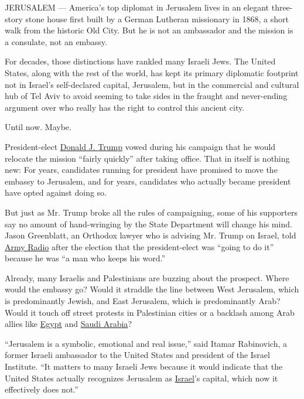 JERUSALEM --- America's top diplomat in Jerusalem lives in an elegant
three-story stone house first built by a German Lutheran missionary in
1868, a short walk from the historic Old City. But he is not an
ambassador and the mission is a consulate, not an embassy.

For decades, those distinctions have rankled many Israeli Jews. The
United States, along with the rest of the world, has kept its primary
diplomatic footprint not in Israel's self-declared capital, Jerusalem,
but in the commercial and cultural hub of Tel Aviv to avoid seeming to
take sides in the fraught and never-ending argument over who really has
the right to control this ancient city.

Until now. Maybe.

President-elect
\href{http://www.nytimes.com/topic/person/donald-trump}{Donald J. Trump}
vowed during his campaign that he would relocate the mission ``fairly
quickly'' after taking office. That in itself is nothing new: For years,
candidates running for president have promised to move the embassy to
Jerusalem, and for years, candidates who actually became president have
opted against doing so.

But just as Mr. Trump broke all the rules of campaigning, some of his
supporters say no amount of hand-wringing by the State Department will
change his mind. Jason Greenblatt, an Orthodox lawyer who is advising
Mr. Trump on Israel, told
\href{http://www.timesofisrael.com/trump-adviser-he-doesnt-see-settlements-as-peace-obstacle/}{Army
Radio} after the election that the president-elect was ``going to do
it'' because he was ``a man who keeps his word.''

Already, many Israelis and Palestinians are buzzing about the prospect.
Where would the embassy go? Would it straddle the line between West
Jerusalem, which is predominantly Jewish, and East Jerusalem, which is
predominantly Arab? Would it touch off street protests in Palestinian
cities or a backlash among Arab allies like
\href{http://www.nytimes.com/topic/destination/egypt}{Egypt} and
\href{http://www.nytimes.com/topic/destination/saudi-arabia}{Saudi
Arabia}?

``Jerusalem is a symbolic, emotional and real issue,'' said Itamar
Rabinovich, a former Israeli ambassador to the United States and
president of the Israel Institute. ``It matters to many Israeli Jews
because it would indicate that the United States actually recognizes
Jerusalem as
\href{http://www.nytimes.com/topic/destination/israel?inline=nyt-geo}{Israel}'s
capital, which now it effectively does not.''

